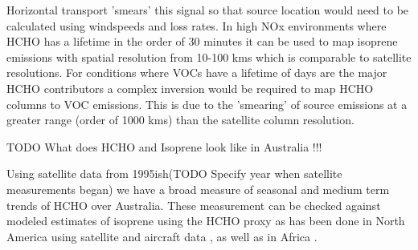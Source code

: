 Horizontal transport 'smears' this signal so that source location would need to be calculated using windspeeds and loss rates.
In high NOx environments where HCHO has a lifetime in the order of 30 minutes it can be used to map isoprene emissions with spatial resolution from 10-100 kms which is comparable to satellite resolutions.
For conditions where VOCs have a lifetime of days are the major HCHO contributors a complex inversion would be required to map HCHO columns to VOC emissions.
This is due to the 'smearing' of source emissions at a greater range (order of 1000 kms) than the satellite column resolution.

TODO What does HCHO and Isoprene look like in Australia !!!

Using satellite data from 1995ish(TODO Specify year when satellite measurements began) we have a broad measure of seasonal and medium term trends of HCHO over Australia.
These measurement can be checked against modeled estimates of isoprene using the HCHO proxy as has been done in North America using satellite and aircraft data \cite{Millet_2006}, as well as in Africa \cite{Marais_2014}.